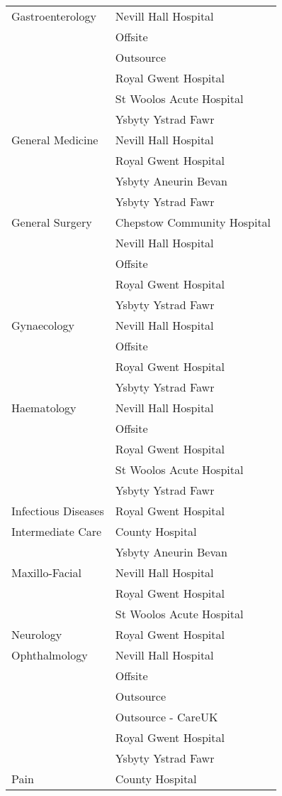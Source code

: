 \documentclass[thesis.tex]{subfiles}
\begin{document}
\begin{center}
\begin{longtable}{ll}
Gastroenterology&	Nevill Hall Hospital\\
	&Offsite\\
	&Outsource\\
	&Royal Gwent Hospital\\
	&St Woolos Acute Hospital\\
	&Ysbyty Ystrad Fawr\\\midrule
General Medicine&	Nevill Hall Hospital\\
	&Royal Gwent Hospital\\
	&Ysbyty Aneurin Bevan\\
	&Ysbyty Ystrad Fawr\\\midrule 
General Surgery	&Chepstow Community Hospital\\
	&Nevill Hall Hospital\\
	&Offsite\\
	&Royal Gwent Hospital\\ 
	&Ysbyty Ystrad Fawr\\\midrule
Gynaecology	&Nevill Hall Hospital\\
	&Offsite\\
	&Royal Gwent Hospital\\
	&Ysbyty Ystrad Fawr\\\midrule
Haematology	&Nevill Hall Hospital\\
	&Offsite\\
	&Royal Gwent Hospital\\
	&St Woolos Acute Hospital\\
	&Ysbyty Ystrad Fawr\\\midrule
Infectious Diseases&	Royal Gwent Hospital\\\midrule
Intermediate Care	&County Hospital\\
	&Ysbyty Aneurin Bevan\\\midrule
Maxillo-Facial	&Nevill Hall Hospital\\
	&Royal Gwent Hospital\\
	&St Woolos Acute Hospital\\\midrule
Neurology&	Royal Gwent Hospital\\\midrule
Ophthalmology&	Nevill Hall Hospital\\
	&Offsite\\
	&Outsource\\
	&Outsource - CareUK\\
	&Royal Gwent Hospital\\
	&Ysbyty Ystrad Fawr\\\midrule
Pain	&County Hospital\\

\end{longtable}
\end{center}
\end{document}
